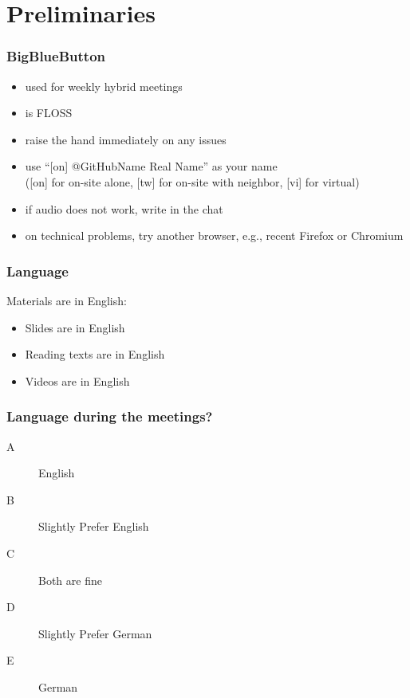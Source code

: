 

\title{\mylecture}



\section{Preliminaries}

\begin{frame}
	\frametitle{BigBlueButton}
	\begin{itemize}[<+-| alert@+>]
		\item used for weekly hybrid meetings
		\item is FLOSS
		\item raise the hand immediately on any issues
		\item use ``[on] @GitHubName Real Name'' as your name \\
			([on] for on-site alone, [tw] for on-site with neighbor, [vi] for virtual)
		\item if audio does not work, write in the chat
		\item on technical problems, try another browser, e.g., recent Firefox or Chromium
	\end{itemize}
\end{frame}

\begin{frame}
	\frametitle{Language}
	Materials are in English:
	\begin{itemize}
		\item Slides are in English
		\item Reading texts are in English
		\item Videos are in English
	\end{itemize}
\end{frame}

\begin{assignment}
	\frametitle{Language during the meetings?}
	\begin{task}
	\begin{description}
	\item[A] English
	\item[B] Slightly Prefer English
	\item[C] Both are fine
	\item[D] Slightly Prefer German
	\item[E] German
	\end{description}
	\end{task}
\end{assignment}


